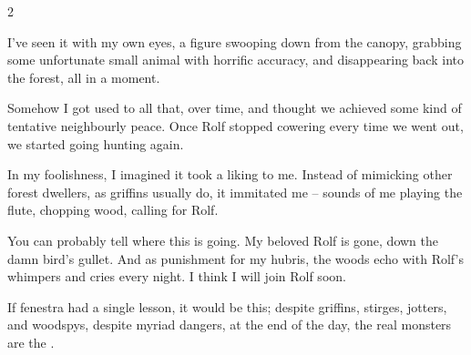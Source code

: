 \begin{multicols}{2}
\begin{exampletext}
  I've seen it with my own eyes, a figure swooping down from the canopy, grabbing some unfortunate small animal with horrific accuracy, and disappearing back into the forest, all in a moment.

  Somehow I got used to all that, over time, and thought we achieved some kind of tentative neighbourly peace.
  Once Rolf stopped cowering every time we went out, we started going hunting again.

  In my foolishness, I imagined it took a liking to me.
  Instead of mimicking other forest dwellers, as \glspl{griffin} usually do, it immitated me -- sounds of me playing the flute, chopping wood, calling for Rolf.

  You can probably tell where this is going.
  My beloved Rolf is gone, down the damn bird's gullet.
  And as punishment for my hubris, the woods echo with Rolf's whimpers and cries every night.
  I think I will join Rolf soon.

\end{exampletext}

If \gls{fenestra} had a single lesson, it would be this;
despite \glspl{griffin}, stirges, \glspl{jotter}, and \glspl{woodspy}, despite myriad dangers, at the end of the day, the real monsters are the \emph{}.

\end{multicols}
